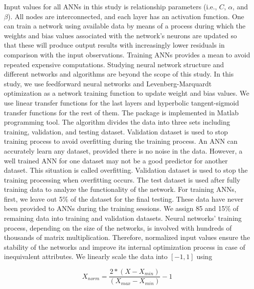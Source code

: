 Input values for all ANNs in this study is \qsvs{} relationship parameters (i.e., $C$, $\alpha$, and $\beta$). All nodes are interconnected, and each layer has an activation function. One can train a network using available data by means of a process during which the weights and bias values associated with the network's neurons are updated so that these will produce output results with increasingly lower residuals in comparison with the input observations. Training ANNs provides a mean to avoid repeated expensive computations. Studying neural network structure and different networks and algorithms are beyond the scope of this study.  In this study, we use feedforward neural networks and Levenberg-Marquardt optimization as a network training function to update weight and bias values. We use linear transfer functions for the last layers and hyperbolic tangent-sigmoid transfer functions for the rest of them. The package is implemented in Matlab programming tool. The algorithm divides the data into three sets including training, validation, and testing dataset. Validation dataset is used to stop training process to avoid overfitting during the training process. An ANN can accurately learn any dataset, provided there is no noise in the data. However, a well trained ANN for one dataset may not be a good predictor for another dataset. This situation is called overfitting. Validation dataset is used to stop the training processing when overfitting occurs. The test dataset is used after fully training data to analyze the functionality of the network. For training ANNs, first, we leave out 5\% of the dataset for the final testing. These data have never been provided to ANNs during the training sessions. We assign 85 and 15\% of remaining data into training and validation datasets.  Neural networks' training process, depending on the size of the networks, is involved with hundreds of thousands of matrix multiplication. Therefore, normalized input values ensure the stability of the networks and improve its internal optimization process in case of inequivalent attributes. We linearly scale the data into $[-1,1]$ using

\begin{equation}
X_{norm} = \frac{2*(X-X_{min})}{(X_{max}-X_{min})}-1
\end{equation}

